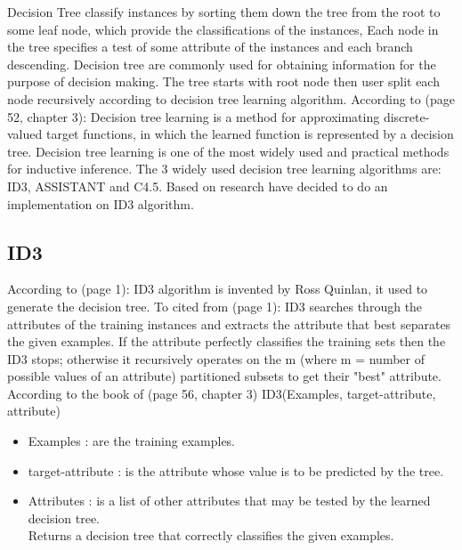 \documentclass{report}
\begin{document}
Decision Tree classify instances by sorting them down the tree from the root to some leaf node, which provide the classifications of the instances, Each node in the tree specifies a test of some attribute of the instances and each branch descending.
Decision tree are commonly used for obtaining information for the purpose of decision making. The tree starts with root node then user split each node recursively according to decision tree learning algorithm.
According to \cite{Mitchell1997MachineLearning}(page 52, chapter 3): Decision tree learning is a method for approximating discrete-valued target functions, in which the learned function is represented by a decision tree. Decision tree learning is one of the most widely used and practical methods for inductive inference. The 3 widely used decision tree learning algorithms are: ID3, ASSISTANT and C4.5. Based on research have decided to do an implementation on ID3 algorithm. 


\subsection{ID3}
\label{sec:ID3}

According to \cite{OverviewOfDecisionTrees}(page 1): ID3 algorithm is invented by Ross Quinlan, it used to generate the decision tree. 
To cited from \cite{OverviewOfDecisionTrees}(page 1): ID3 searches through the attributes of the training instances and extracts the attribute that best separates the given examples. If the attribute perfectly classifies the training sets then the ID3 stops; otherwise it recursively operates on the m (where m = number of possible values of an attribute) partitioned subsets to get their "best" attribute. \\

According to the book of \cite{Mitchell1997MachineLearning}(page 56, chapter 3) ID3(Examples, target-attribute, attribute)
\begin{itemize}
\item Examples : are the training examples.
\item target-attribute : is the attribute whose value is to be predicted by the tree.
\item Attributes : is a list of other attributes that may be tested by the learned decision tree.\\
Returns a decision tree that correctly classifies the given examples.
\end{itemize}
\end{document}
